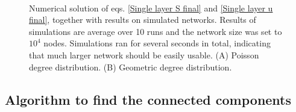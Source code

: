 \documentclass[
11pt, %
english, %
singlespacing, %
nolistspacing, %
liststotoc, %
headsepline, %
]{MastersDoctoralThesis} %
\begin{document}
{
\begin{figure}
	\\
	\caption{Numerical solution of eqs. \eqref{Single layer S final} and \eqref{Single layer u final}, together with results on simulated networks. Results of simulations are average over 10 runs and the network size was set to $10^4$ nodes. Simulations ran for several seconds in total, indicating that much larger network should be easily usable. (A) Poisson degree distribution. (B) Geometric degree distribution.}
\end{figure}
}

\subsection{Algorithm to find the connected components}
\end{document}
